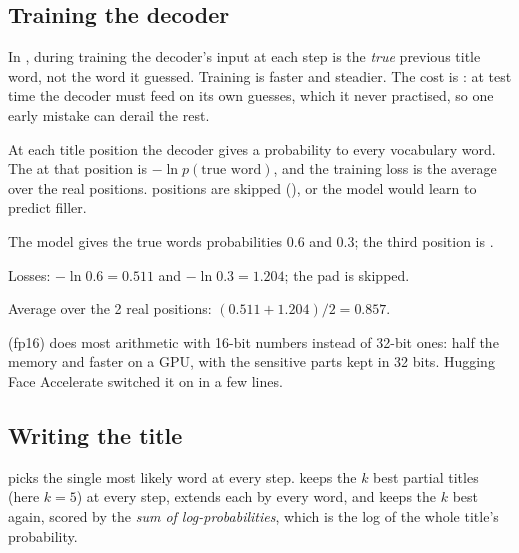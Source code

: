 \subsection*{Training the decoder}

\begin{definition}
In , during training the decoder's input at each step is the \emph{true} previous title word, not the word it guessed. Training is faster and steadier. The cost is : at test time the decoder must feed on its own guesses, which it never practised, so one early mistake can derail the rest.
\end{definition}

\begin{definition}
At each title position the decoder gives a probability to every vocabulary word. The  at that position is $-\ln p(\text{true word})$, and the training loss is the average over the real positions.  positions are skipped (), or the model would learn to predict filler.
\end{definition}

\begin{example}
The model gives the true words probabilities $0.6$ and $0.3$; the third position is .
\begin{steps}
  \item Losses: $-\ln 0.6 = 0.511$ and $-\ln 0.3 = 1.204$; the pad is skipped.
  \item Average over the 2 real positions: $(0.511 + 1.204)/2 = 0.857$.
\end{steps}
\end{example}

\begin{definition}
 (fp16) does most arithmetic with 16-bit numbers instead of 32-bit ones: half the memory and faster on a GPU, with the sensitive parts kept in 32 bits. Hugging Face Accelerate switched it on in a few lines.
\end{definition}

\subsection*{Writing the title}

\begin{definition}
 picks the single most likely word at every step.  keeps the $k$ best partial titles (here $k = 5$) at every step, extends each by every word, and keeps the $k$ best again, scored by the \emph{sum of log-probabilities}, which is the log of the whole title's probability.
\end{definition}

